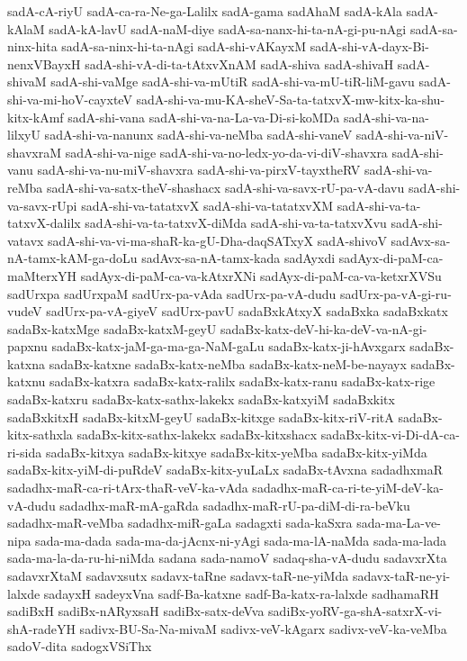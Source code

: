 {sadA-cA-riyU
sadA-ca-ra-Ne-ga-Lalilx
sadA-gama
sadAhaM
sadA-kAla
sadA-kAlaM
sadA-kA-lavU
sadA-naM-diye
sadA-sa-nanx-hi-ta-nA-gi-pu-nAgi
sadA-sa-ninx-hita
sadA-sa-ninx-hi-ta-nAgi
sadA-shi-vAKayxM
sadA-shi-vA-dayx-Bi-nenxVBayxH
sadA-shi-vA-di-ta-tAtxvXnAM
sadA-shiva
sadA-shivaH
sadA-shivaM
sadA-shi-vaMge
sadA-shi-va-mUtiR
sadA-shi-va-mU-tiR-liM-gavu
sadA-shi-va-mi-hoV-cayxteV
sadA-shi-va-mu-KA-sheV-Sa-ta-tatxvX-mw-kitx-ka-shu-kitx-kAmf
sadA-shi-vana
sadA-shi-va-na-La-va-Di-si-koMDa
sadA-shi-va-na-lilxyU
sadA-shi-va-nanunx
sadA-shi-va-neMba
sadA-shi-vaneV
sadA-shi-va-niV-shavxraM
sadA-shi-va-nige
sadA-shi-va-no-ledx-yo-da-vi-diV-shavxra
sadA-shi-vanu
sadA-shi-va-nu-miV-shavxra
sadA-shi-va-pirxV-tayxtheRV
sadA-shi-va-reMba
sadA-shi-va-satx-theV-shashacx
sadA-shi-va-savx-rU-pa-vA-davu
sadA-shi-va-savx-rUpi
sadA-shi-va-tatatxvX
sadA-shi-va-tatatxvXM
sadA-shi-va-ta-tatxvX-dalilx
sadA-shi-va-ta-tatxvX-diMda
sadA-shi-va-ta-tatxvXvu
sadA-shi-vatavx
sadA-shi-va-vi-ma-shaR-ka-gU-Dha-daqSATxyX
sadA-shivoV
sadAvx-sa-nA-tamx-kAM-ga-doLu
sadAvx-sa-nA-tamx-kada
sadAyxdi
sadAyx-di-paM-ca-maMterxYH
sadAyx-di-paM-ca-va-kAtxrXNi
sadAyx-di-paM-ca-va-ketxrXVSu
sadUrxpa
sadUrxpaM
sadUrx-pa-vAda
sadUrx-pa-vA-dudu
sadUrx-pa-vA-gi-ru-vudeV
sadUrx-pa-vA-giyeV
sadUrx-pavU
sadaBxkAtxyX
sadaBxka
sadaBxkatx
sadaBx-katxMge
sadaBx-katxM-geyU
sadaBx-katx-deV-hi-ka-deV-va-nA-gi-papxnu
sadaBx-katx-jaM-ga-ma-ga-NaM-gaLu
sadaBx-katx-ji-hAvxgarx
sadaBx-katxna
sadaBx-katxne
sadaBx-katx-neMba
sadaBx-katx-neM-be-nayayx
sadaBx-katxnu
sadaBx-katxra
sadaBx-katx-ralilx
sadaBx-katx-ranu
sadaBx-katx-rige
sadaBx-katxru
sadaBx-katx-sathx-lakekx
sadaBx-katxyiM
sadaBxkitx
sadaBxkitxH
sadaBx-kitxM-geyU
sadaBx-kitxge
sadaBx-kitx-riV-ritA
sadaBx-kitx-sathxla
sadaBx-kitx-sathx-lakekx
sadaBx-kitxshacx
sadaBx-kitx-vi-Di-dA-ca-ri-sida
sadaBx-kitxya
sadaBx-kitxye
sadaBx-kitx-yeMba
sadaBx-kitx-yiMda
sadaBx-kitx-yiM-di-puRdeV
sadaBx-kitx-yuLaLx
sadaBx-tAvxna
sadadhxmaR
sadadhx-maR-ca-ri-tArx-thaR-veV-ka-vAda
sadadhx-maR-ca-ri-te-yiM-deV-ka-vA-dudu
sadadhx-maR-mA-gaRda
sadadhx-maR-rU-pa-diM-di-ra-beVku
sadadhx-maR-veMba
sadadhx-miR-gaLa
sadagxti
sada-kaSxra
sada-ma-La-ve-nipa
sada-ma-dada
sada-ma-da-jAcnx-ni-yAgi
sada-ma-lA-naMda
sada-ma-lada
sada-ma-la-da-ru-hi-niMda
sadana
sada-namoV
sadaq-sha-vA-dudu
sadavxrXta
sadavxrXtaM
sadavxsutx
sadavx-taRne
sadavx-taR-ne-yiMda
sadavx-taR-ne-yi-lalxde
sadayxH
sadeyxVna
sadf-Ba-katxne
sadf-Ba-katx-ra-lalxde
sadhamaRH
sadiBxH
sadiBx-nARyxsaH
sadiBx-satx-deVva
sadiBx-yoRV-ga-shA-satxrX-vi-shA-radeYH
sadivx-BU-Sa-Na-mivaM
sadivx-veV-kAgarx
sadivx-veV-ka-veMba
sadoV-dita
sadogxVSiThx
}
